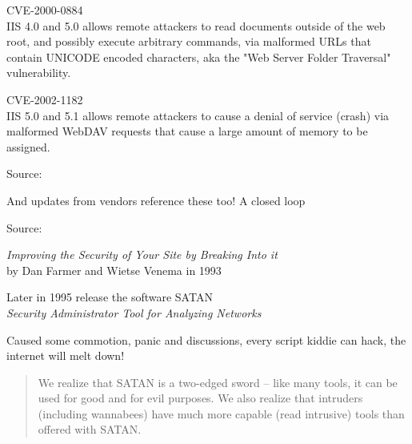 \documentclass[Screen16to9,17pt]{foils}
\begin{document}

\begin{list1}
\item \small CVE-2000-0884\\
IIS 4.0 and 5.0 allows remote attackers to read documents outside of
the web root, and possibly execute arbitrary commands, via malformed
URLs that contain UNICODE encoded characters, aka the "Web Server
Folder Traversal" vulnerability.

\item \small CVE-2002-1182\\
IIS 5.0 and 5.1 allows remote attackers to cause a denial of service
(crash) via malformed WebDAV requests that cause a large amount of
memory to be assigned.

\item Source:\\
\end{list1}

\centerline{And updates from vendors reference these too! A closed loop}





Source:



\begin{list1}
\item \emph{Improving the Security of Your Site by Breaking Into it}\\ by
Dan Farmer and Wietse Venema in 1993
\item Later in 1995 release the software SATAN\\
\emph{Security Administrator Tool for Analyzing Networks}
\item Caused some commotion, panic and discussions, every script kiddie can hack, the internet will melt down!
\vskip 5mm
\begin{quote}
We realize that SATAN is a two-edged sword -- like
many tools, it can be used for good and for evil
purposes. We also realize that intruders (including
wannabees) have much more capable (read intrusive)
tools than offered with SATAN.
\end{quote}
\end{list1}
\end{document}
